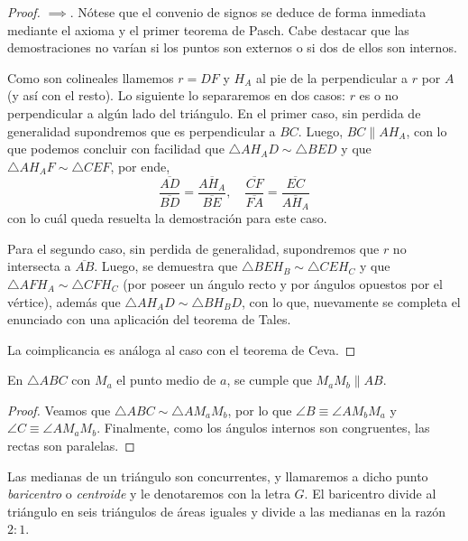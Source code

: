 \documentclass[11pt,a4paper]{book}
\begin{document}
\begin{proof}
	$\implies$. Nótese que el convenio de signos se deduce de forma inmediata mediante el axioma y el primer teorema de Pasch. Cabe destacar que las demostraciones no varían si los puntos son externos o si dos de ellos son internos.

	Como son colineales llamemos $r=DF$ y $H_A$ al pie de la perpendicular a $r$ por $A$ (y así con el resto). Lo siguiente lo separaremos en dos casos: $r$ es o no perpendicular a algún lado del triángulo. En el primer caso, sin perdida de generalidad supondremos que es perpendicular a $BC$. Luego, $BC\parallel AH_A$, con lo que podemos concluir con facilidad que $\triangle AH_AD\sim\triangle BED$ y que $\triangle AH_AF\sim\triangle CEF$, por ende,
	$$\frac{\overline{AD}}{\overline{BD}}=\frac{\overline{AH_A}}{\overline{BE}},\quad\frac{\overline{CF}}{\overline{FA}}=\frac{\overline{EC}}{\overline{AH_A}}$$
	con lo cuál queda resuelta la demostración para este caso.

	Para el segundo caso, sin perdida de generalidad, supondremos que $r$ no intersecta a $\overline{AB}$. Luego, se demuestra que $\triangle BEH_B\sim\triangle CEH_C$ y que $\triangle AFH_A\sim\triangle CFH_C$ (por poseer un ángulo recto y por ángulos opuestos por el vértice), además que $\triangle AH_AD\sim\triangle BH_BD$, con lo que, nuevamente se completa el enunciado con una aplicación del teorema de Tales.
	
	La coimplicancia es análoga al caso con el teorema de Ceva.
\end{proof}
\begin{lem}
En $\triangle ABC$ con $M_a$ el punto medio de $a$, se cumple que $M_aM_b\parallel AB$.
\end{lem}
\begin{proof}
Veamos que $\triangle ABC\sim\triangle AM_aM_b$, por lo que $\angle B\equiv \angle AM_bM_a$ y $\angle C\equiv\angle AM_aM_b$. Finalmente, como los ángulos internos son congruentes, las rectas son paralelas.
\end{proof}
\begin{thm}
	Las medianas de un triángulo son concurrentes, y llamaremos a dicho punto \textit{baricentro} o \textit{centroide} y le denotaremos con la letra $G$. El baricentro divide al triángulo en seis triángulos de áreas iguales y divide a las medianas en la razón $2:1$. 
\end{thm}
\end{document}
